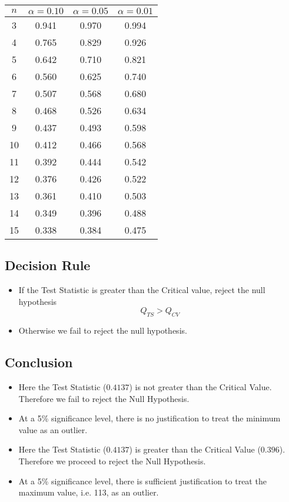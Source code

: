 \documentclass[a4paper,12pt]{article}
\begin{document}
\begin{center}
\begin{tabular}{|c|c|c|c|}
\hline
$n$	&	$\alpha=0.10$	&	$\alpha=0.05$	&	$\alpha=0.01$	\\ \hline
3	&	0.941	&	0.970	&	0.994	\\ \hline
4	&	0.765	&	0.829	&	0.926	\\ \hline
5	&	0.642	&	0.710	&	0.821	\\ \hline
6	&	0.560	&	0.625	&	0.740	\\ \hline
7	&	0.507	&	0.568	&	0.680	\\ \hline
8	&	0.468	&	0.526	&	0.634	\\ \hline
9	&	0.437	&	0.493	&	0.598	\\ \hline
10	&	0.412	&	0.466	&	0.568	\\ \hline
11	&	0.392	&	0.444	&	0.542	\\ \hline
12	&	0.376	&	0.426	&	0.522	\\ \hline
13	&	0.361	&	0.410	&	0.503	\\ \hline
14	&	0.349	&	0.396	&	0.488	\\ \hline
15	&	0.338	&	0.384	&	0.475	\\ \hline

\end{tabular} 
\end{center}

\subsection*{Decision Rule}


\begin{itemize}
    \item 
 If the Test Statistic is greater than the Critical value, reject the null hypothesis
\[ Q_{TS} > Q_{CV}\]

\item  Otherwise we fail to reject the null hypothesis.
\end{itemize}
\subsection*{Conclusion}

\begin{itemize}
\item Here the Test Statistic ($0.4137$) is not greater than the Critical Value. Therefore we fail to reject the Null Hypothesis. 

\item At a 5\% significance level, there is no justification to treat the minimum value as an outlier.

\item Here the Test Statistic ($0.4137$) is greater than the Critical Value ($0.396$). Therefore we proceed to reject the Null Hypothesis. 

\item At a 5\% significance level, there is sufficient justification to treat the maximum value, i.e. 113, as an outlier.
\end{itemize}
\end{document}
